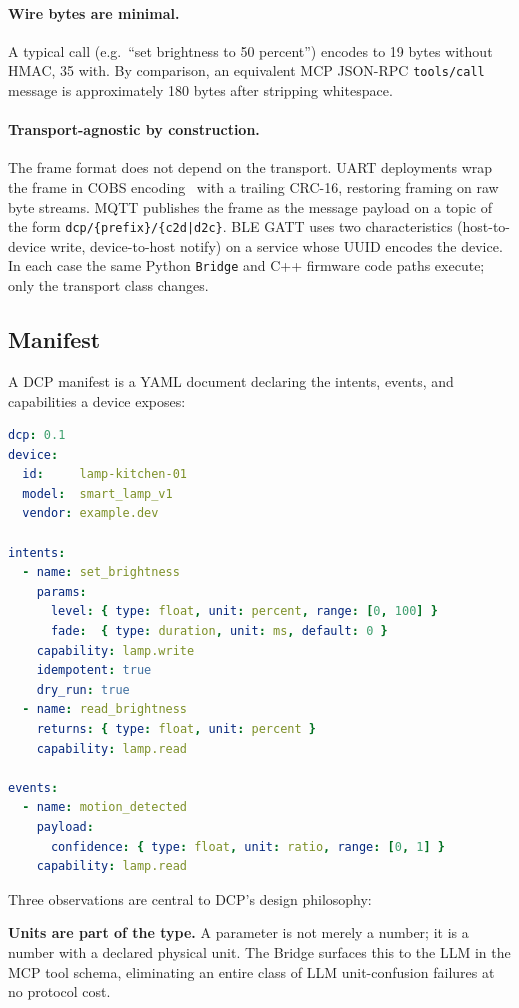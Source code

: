 \documentclass[11pt,a4paper]{article}
\begin{document}
\paragraph{Wire bytes are minimal.} A typical call (e.g.\ ``set brightness
to 50 percent'') encodes to 19 bytes without HMAC, 35 with. By comparison,
an equivalent MCP JSON-RPC \texttt{tools/call} message is approximately
180 bytes after stripping whitespace.

\paragraph{Transport-agnostic by construction.} The frame format does
not depend on the transport. UART deployments wrap the frame in COBS
encoding~\cite{cobs1999} with a trailing CRC-16, restoring framing on raw
byte streams. MQTT publishes the frame as the message payload on a topic
of the form \texttt{dcp/\{prefix\}/\{c2d|d2c\}}. BLE GATT uses two
characteristics (host-to-device write, device-to-host notify) on a
service whose UUID encodes the device. In each case the same Python
\texttt{Bridge} and C++ firmware code paths execute; only the transport
class changes.

\subsection{Manifest}

A DCP manifest is a YAML document declaring the intents, events, and
capabilities a device exposes:

\begin{lstlisting}[language=yaml]
dcp: 0.1
device:
  id:     lamp-kitchen-01
  model:  smart_lamp_v1
  vendor: example.dev

intents:
  - name: set_brightness
    params:
      level: { type: float, unit: percent, range: [0, 100] }
      fade:  { type: duration, unit: ms, default: 0 }
    capability: lamp.write
    idempotent: true
    dry_run: true
  - name: read_brightness
    returns: { type: float, unit: percent }
    capability: lamp.read

events:
  - name: motion_detected
    payload:
      confidence: { type: float, unit: ratio, range: [0, 1] }
    capability: lamp.read
\end{lstlisting}

\noindent
Three observations are central to DCP's design philosophy:

\textbf{Units are part of the type.} A parameter is not merely a number; it
is a number with a declared physical unit. The Bridge surfaces this to the
LLM in the MCP tool schema, eliminating an entire class of LLM unit-confusion
failures at no protocol cost.
\end{document}
